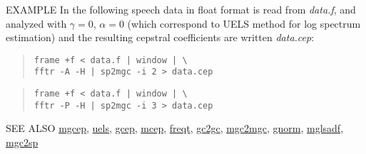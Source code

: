 \begin{qsection}{EXAMPLE}
In the following speech data in float format is read
from {\em data.f}, and analyzed with $\gamma=0$, $\alpha=0$
(which correspond to UELS method for log spectrum estimation)
and the resulting cepstral coefficients are written {\em data.cep}:
\begin{quote}
  \verb!frame +f < data.f | window | \! \\
  \verb!fftr -A -H | sp2mgc -i 2 > data.cep!
\end{quote}
\begin{quote}
  \verb!frame +f < data.f | window | \! \\
  \verb!fftr -P -H | sp2mgc -i 3 > data.cep!
\end{quote}
\end{qsection}

\begin{qsection}{SEE ALSO}
\hyperlink{mgcep}{mgcep},
\hyperlink{uels}{uels},
\hyperlink{gcep}{gcep},
\hyperlink{mcep}{mcep},
\hyperlink{freqt}{freqt},
\hyperlink{gc2gc}{gc2gc},
\hyperlink{mgc2mgc}{mgc2mgc},
\hyperlink{gnorm}{gnorm},
\hyperlink{mglsadf}{mglsadf},
\hyperlink{mgc2sp}{mgc2sp}
\end{qsection}
